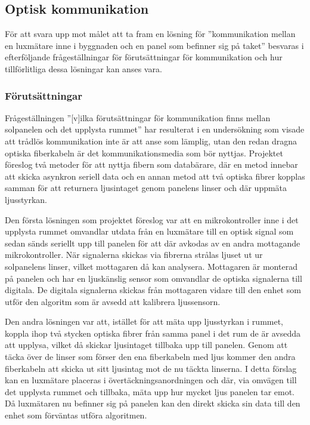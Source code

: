     \subsection{Optisk kommunikation} %
    \label{sub:optisk_kommunikation}
        För att svara upp mot målet att ta fram en lösning för ''kommunikation mellan en luxmätare inne i byggnaden och en panel som befinner sig på taket'' besvaras i efterföljande frågeställningar för förutsättningar för kommunikation och hur tillförlitliga dessa lösningar kan anses vara.

        \subsubsection{Förutsättningar} %
        \label{sub:forutsattningar}
                
            Frågeställningen ''[v]ilka förutsättningar för kommunikation finns mellan solpanelen och det upplysta rummet'' har resulterat i en undersökning som visade att trådlös kommunikation inte är att anse som lämplig, utan den redan dragna optiska fiberkabeln är det kommunikationsmedia som bör nyttjas. Projektet föreslog två metoder för att nyttja fibern som databärare, där en metod innebar att skicka asynkron seriell data och en annan metod att två optiska fibrer kopplas samman för att returnera ljusintaget genom panelens linser och där uppmäta ljusstyrkan.\bigskip

            Den första lösningen som projektet föreslog var att en mikrokontroller inne i det upplysta rummet omvandlar utdata från en luxmätare till en optisk signal som sedan sänds seriellt upp till panelen för att där avkodas av en andra mottagande mikrokontroller. När signalerna skickas via fibrerna strålas ljuset ut ur solpanelens linser, vilket mottagaren då kan analysera. Mottagaren är monterad på panelen och har en ljuskänslig sensor som omvandlar de optiska signalerna till digitala. De digitala signalerna skickas från mottagaren vidare till den enhet som utför den algoritm som är avsedd att kalibrera ljussensorn. \bigskip

            Den andra lösningen var att, istället för att mäta upp ljusstyrkan i rummet, koppla ihop två stycken optiska fibrer från samma panel i det rum de är avsedda att upplysa, vilket då skickar ljusintaget tillbaka upp till panelen. Genom att täcka över de linser som förser den ena fiberkabeln med ljus kommer den andra fiberkabeln att skicka ut sitt ljusintag mot de nu täckta linserna. I detta förslag kan en luxmätare placeras i övertäckningsanordningen och där, via omvägen till det upplysta rummet och tillbaka, mäta upp hur mycket ljus panelen tar emot. Då luxmätaren nu befinner sig på panelen kan den direkt skicka sin data till den enhet som förväntas utföra algoritmen.

